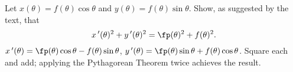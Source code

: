 {Let $x(\theta) = f(\theta)\cos\theta$ and $y(\theta)=f(\theta)\sin\theta$. Show, as suggested by the text, that 
$$x\,'(\theta)^2+y\,'(\theta)^2 = \fp(\theta)^2+f(\theta)^2.$$
}
{$x\,'(\theta) = \fp(\theta)\cos\theta -f(\theta)\sin\theta$, $y\,'(\theta) = \fp(\theta)\sin\theta + f(\theta)\cos\theta$. Square each and add; applying the Pythagorean Theorem twice achieves the result.
}
